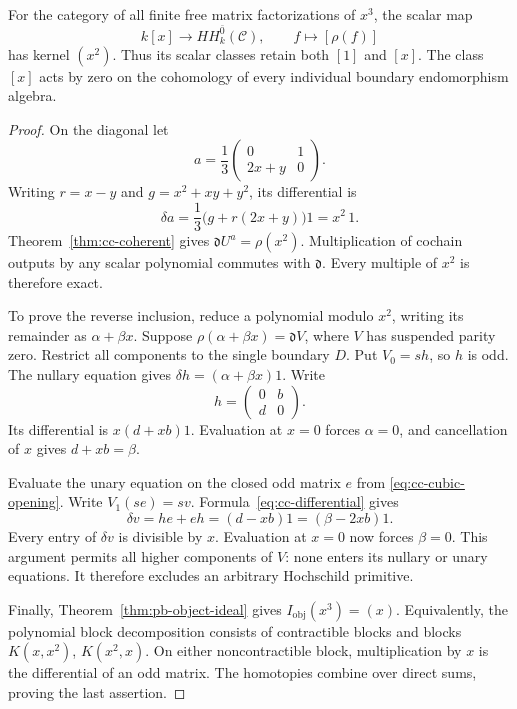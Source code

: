 \begin{theorem}
\label{thm:cc-cubic}
For the category of all finite free matrix factorizations of
\(x^3\), the scalar map
\[
 k[x]\longrightarrow HH_k^{\bar0}(\mathcal C),
       \qquad f\longmapsto[\rho(f)]
\]
has kernel \((x^2)\). Thus its scalar classes retain both
\([1]\) and \([x]\).
The class \([x]\) acts by zero on the cohomology of every
individual boundary endomorphism algebra.
\end{theorem}
\begin{proof}
On the diagonal let
\[
 a=\frac13\begin{pmatrix}0&1\\2x+y&0\end{pmatrix}.
\]
Writing \(r=x-y\) and \(g=x^2+xy+y^2\), its differential is
\[
 \delta a=\frac13\bigl(g+r(2x+y)\bigr)1=x^2\,1.
\]
Theorem~\ref{thm:cc-coherent} gives
\(\mathfrak dU^a=\rho(x^2)\).
Multiplication of cochain outputs by any scalar polynomial
commutes with \(\mathfrak d\). Every multiple of \(x^2\)
is therefore exact.

To prove the reverse inclusion, reduce a polynomial modulo
\(x^2\), writing its remainder as \(\alpha+\beta x\).
Suppose \(\rho(\alpha+\beta x)=\mathfrak dV\), where \(V\)
has suspended parity zero. Restrict all components to the
single boundary \(D\). Put \(V_0=sh\), so \(h\) is odd.
The nullary equation gives
\(\delta h=(\alpha+\beta x)1\).
Write
\[
 h=\begin{pmatrix}0&b\\d&0\end{pmatrix}.
\]
Its differential is \(x(d+xb)1\). Evaluation at \(x=0\)
forces \(\alpha=0\), and cancellation of \(x\) gives
\(d+xb=\beta\).

Evaluate the unary equation on the closed odd matrix
\(e\) from \eqref{eq:cc-cubic-opening}.
Write \(V_1(se)=sv\). Formula~\eqref{eq:cc-differential}
gives
\[
 \delta v=he+eh=(d-xb)1=(\beta-2xb)1.
\]
Every entry of \(\delta v\) is divisible by \(x\).
Evaluation at \(x=0\) now forces \(\beta=0\).
This argument permits all higher components of \(V\):
none enters its nullary or unary equations.
It therefore excludes an arbitrary Hochschild primitive.

Finally, Theorem~\ref{thm:pb-object-ideal} gives
\(I_{\mathrm{obj}}(x^3)=(x)\).
Equivalently, the polynomial block decomposition consists of
contractible blocks and blocks \(K(x,x^2)\), \(K(x^2,x)\).
On either noncontractible block, multiplication by \(x\) is
the differential of an odd matrix. The homotopies combine
over direct sums, proving the last assertion.
\end{proof}

